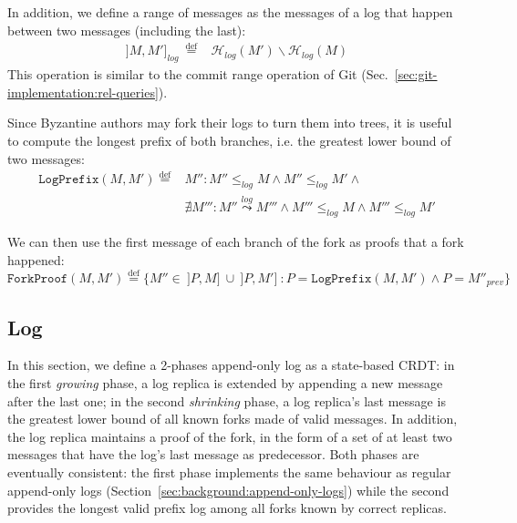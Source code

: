 \documentclass[9pt, oneside]{article}   	%
\newcommand{\defeq}{\overset{\mathrm{def}}{=}}
\newcommand{\logleadsto}{\overset{\textit{log}}\leadsto}
\begin{document}
In addition, we define a range of messages as the messages of a log that happen between two messages (including the last):
\begin{eqnarray}
	]   M, M' ]_\textit{log}~ \defeq &  \mathcal{H}_\textit{log}(M') \backslash \mathcal{H}_\textit{log}(M) 
\end{eqnarray}
This operation is similar to the commit range operation of Git (Sec.~\ref{sec:git-implementation:rel-queries}).

Since Byzantine authors may fork their logs to turn them into trees, it is useful to compute the longest prefix of both branches, i.e. the greatest lower bound of two messages:
\begin{equation}
\label{eq:log-message:log-prefix}
\begin{split}
	\texttt{LogPrefix}(M,M') \defeq & M'' : M'' \leq_\textit{log} M \wedge M'' \leq_\textit{log} M' \wedge \\
	 & \nexists M''' : M'' \logleadsto M''' \wedge M''' \leq_\textit{log} M \wedge M''' \leq_\textit{log} M'
\end{split}
\end{equation}

We can then use the first message of each branch of the fork as proofs that a fork happened:
\begin{equation}
 	\texttt{ForkProof}(M, M') \defeq \{ M'' \in ~] P, M ] ~\cup~ ] P, M' ]~: P = \texttt{LogPrefix}(M, M') \wedge P = M''_\textit{prev} \}
\end{equation}

\subsection{Log}
\label{sec:design:log}

In this section, we define a 2-phases append-only log as a state-based CRDT: in the first \textit{growing} phase, a log replica is extended by appending a new message after the last one; in the second \textit{shrinking} phase, a log replica's last message is the greatest lower bound of all known forks made of valid messages. In addition, the log replica maintains a proof of the fork, in the form of a set of at least two messages that have the log's last message as predecessor. Both phases are eventually consistent: the first phase implements the same behaviour as regular append-only logs (Section~\ref{sec:background:append-only-logs}) while the second  provides the longest valid prefix log among all forks known by correct replicas.
\end{document}
